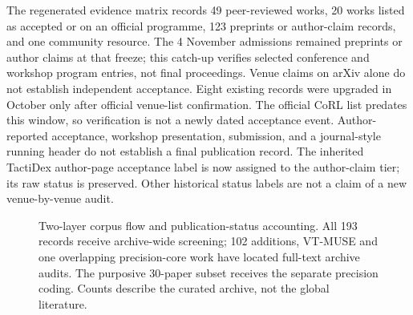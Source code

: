 The regenerated evidence matrix records 49 peer-reviewed works, 20 works listed
as accepted or on an official programme, 123 preprints or author-claim records,
and one community resource. The 4 November admissions remained preprints or
author claims at that freeze; this catch-up verifies selected conference and
workshop program entries, not final proceedings. Venue claims on arXiv alone
do not establish independent acceptance. Eight existing
records were upgraded in October only after official venue-list confirmation.
The official CoRL list predates this window, so verification is not a newly dated
acceptance event. Author-reported acceptance, workshop presentation, submission,
and a journal-style running header do not establish a final publication record.
The inherited TactiDex author-page acceptance label is now assigned to the
author-claim tier; its raw status is preserved. Other historical status labels
are not a claim of a new venue-by-venue audit.

\begin{figure}[t]
\centering
{}
\caption{Two-layer corpus flow and publication-status accounting. All 193 records
receive archive-wide screening; 102 additions, VT-MUSE and one overlapping precision-core
work have located full-text archive audits. The purposive 30-paper subset receives the separate precision coding. Counts describe the curated archive, not the
global literature.}
\label{fig:corpus}
\end{figure}

